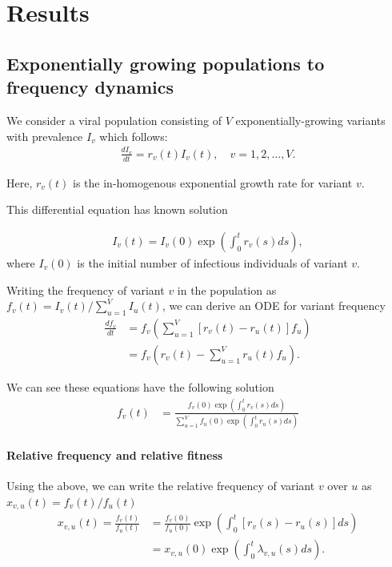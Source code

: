 \documentclass[12pt,oneside,letterpaper]{article}
\begin{document}
\section*{Results}

\subsection*{Exponentially growing populations to frequency dynamics}%

We consider a viral population consisting of $V$ exponentially-growing variants with prevalence $I_{v}$ which follows:
\begin{align*}
    \frac{d I_{v}}{d t} = r_{v}(t) I_{v}(t), \quad v = 1,2, \ldots, V.
\end{align*}

Here, $r_{v}(t)$ is the in-homogenous exponential growth rate for variant $v$.

This differential equation has known solution

\begin{align*}
I_{v}(t) = I_{v}(0) \exp\left( \int_{0}^{t} r_{v}(s) ds\right),
\end{align*}
where $I_{v}(0)$ is the initial number of infectious individuals of variant $v$. 

Writing the frequency of variant $v$ in the population as  $f_{v}(t) = I_{v}(t) / \sum_{u=1}^{V} I_{u}(t)$, we can derive an ODE for variant frequency
\begin{align*}
    \frac{d f_{v}}{d t} &= f_{v} \left( \sum_{u=1}^{V} [r_{v}(t) - r_{u}(t)] f_{u} \right)\\
                        &= f_{v} \left( r_{v}(t) - \sum_{u=1}^{V} r_{u}(t) f_{u} \right).
\end{align*}

We can see these equations have the following solution
\begin{align}
    f_{v}(t) &= \frac{ f_{v}(0) \exp( \int_{0}^{t} r_{v}(s) ds)}{\sum_{u=1}^{V}  f_{u}(0) \exp( \int_{0}^{t} r_{u}(s) ds)}
\end{align}


\paragraph{Relative frequency and relative fitness}%

Using the above, we can write the relative frequency of variant $v$ over $u$ as $x_{v,u}(t) = f_{v}(t) / f_{u}(t)$
\begin{align*}
    x_{v, u}(t) = \frac{f_{v}(t)}{f_{u}(t)} &= \frac{f_{v}(0)}{f_{u}(0)} \exp \left( \int_{0}^{t} [r_{v}(s) - r_{u}(s)] ds \right)\\
                                            &=x_{v,u}(0)\exp \left( \int_{0}^{t} \lambda_{v,u}(s) ds \right).
\end{align*}
\end{document}
